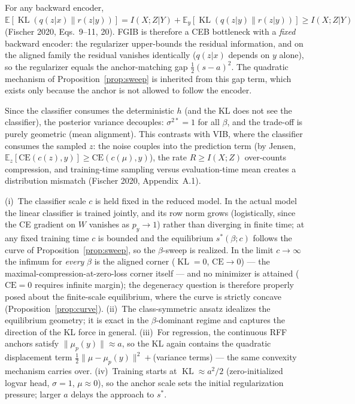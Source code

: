\begin{remark}\label{rem:residual}
For any backward encoder, $\mathbb{E}[\operatorname{KL}(q(z|x)\|r(z|y))]
= I(X;Z|Y) + \mathbb{E}_y[\operatorname{KL}(q(z|y)\|r(z|y))]
\ge I(X;Z|Y)$ (Fischer 2020, Eqs.~9--11, 20). FGIB is therefore a CEB bottleneck with a
\emph{fixed} backward encoder: the regularizer upper-bounds the residual information, and on
the aligned family the residual vanishes identically ($q(z|x)$ depends on $y$ alone), so the
regularizer equals the anchor-matching gap $\tfrac{1}{2}(s-a)^2$. The quadratic mechanism of
Proposition~\ref{prop:sweep} is inherited from this gap term, which exists only because the
anchor is not allowed to follow the encoder.
\end{remark}

\begin{remark}
Since the classifier consumes the deterministic $h$ (and the KL does not see the classifier),
the posterior variance decouples: $\sigma^{2*} = 1$ for all $\beta$, and the trade-off is
purely geometric (mean alignment). This contrasts with VIB, where the classifier consumes
the sampled $z$: the noise couples into the prediction term (by Jensen,
$\mathbb{E}_z[\mathrm{CE}(c(z),y)] \ge \mathrm{CE}(c(\mu),y)$), the rate $R \ge I(X;Z)$
over-counts compression, and training-time sampling versus evaluation-time mean creates a
distribution mismatch (Fischer 2020, Appendix~A.1).
\end{remark}

\begin{remark}\label{rem:caveats}
(i)~The classifier scale $c$ is held fixed in the reduced model. In the actual model the
linear classifier is trained jointly, and its row norm grows (logistically, since the CE
gradient on $W$ vanishes as $p_y \to 1$) rather than diverging in finite time; at any fixed
training time $c$ is bounded and the equilibrium $s^*(\beta; c)$ follows the curve of
Proposition~\ref{prop:sweep}, so the $\beta$-sweep is realized. In the limit $c \to \infty$
the infimum for \emph{every} $\beta$ is the aligned corner ($\operatorname{KL} = 0$,
$\mathrm{CE} \to 0$) --- the maximal-compression-at-zero-loss corner itself --- and no
minimizer is attained ($\mathrm{CE} = 0$ requires infinite margin); the degeneracy question
is therefore properly posed about the finite-scale equilibrium, where the curve is strictly
concave (Proposition~\ref{prop:curve}). (ii)~The class-symmetric ansatz idealizes the
equilibrium geometry; it is exact in the $\beta$-dominant regime and captures the direction
of the KL force in general. (iii)~For regression, the continuous RFF anchors satisfy
$\|\mu_p(y)\| \approx a$, so the KL again contains the quadratic displacement term
$\tfrac{1}{2}\|\mu - \mu_p(y)\|^2 + {}$(variance terms) --- the same convexity mechanism
carries over. (iv)~Training starts at $\operatorname{KL} \approx a^2/2$ (zero-initialized logvar
head, $\sigma = 1$, $\mu \approx 0$), so the anchor scale sets the initial regularization
pressure; larger $a$ delays the approach to $s^*$.
\end{remark}
